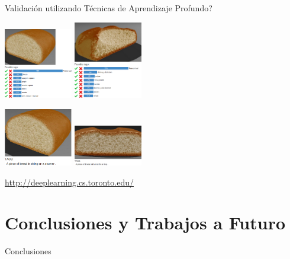 \documentclass[spanish,unknownkeysallowed,10pt]{beamer}
\begin{document}
\begin{frame}{Validación utilizando Técnicas de Aprendizaje Profundo?}


\centering
\includegraphics[width=3cm]{../figures/deep1}
\includegraphics[width=3cm]{../figures/deep4}

\includegraphics[width=3cm]{../figures/deep2}
\includegraphics[width=3cm]{../figures/deep3}


\vspace{0.4cm}
\url{http://deeplearning.cs.toronto.edu/}

\end{frame}



\section[Conclusiones]{Conclusiones y Trabajos a Futuro}


\begin{frame}
\begin{block}{}
\begin{center}
\vspace{1cm}
\huge{Conclusiones}
\vspace{1cm}
\end{center}
\end{block}
\end{frame}
\end{document}
